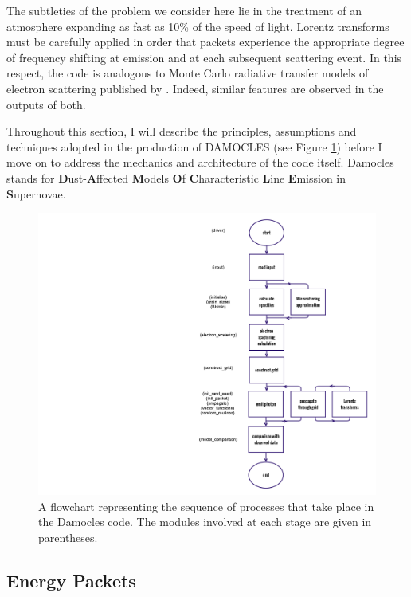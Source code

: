 The subtleties of the problem we consider here lie in the treatment of an atmosphere expanding as fast as 10\% of the speed of light.  Lorentz transforms must be carefully applied in order that packets experience the appropriate degree of frequency shifting at emission and at each subsequent scattering event.  In this respect, the code is analogous to Monte Carlo radiative transfer models of electron scattering published by \citep{Auer1972,Hillier1991}.  Indeed, similar features are observed in the outputs of both.

Throughout this section, I will describe the principles, assumptions and techniques adopted in the production of DAMOCLES (see Figure \ref{fig:flowchart}) before I move on to address the mechanics and architecture of the code itself.  Damocles stands for \textbf{D}ust-\textbf{A}ffected \textbf{M}odels \textbf{O}f \textbf{C}haracteristic \textbf{L}ine \textbf{E}mission in \textbf{S}upernovae.
 

	\begin{figure}
	\centering
	\includegraphics[scale=0.185, trim=650mm 25mm 8mm 25mm]{chapters/chapter2/code_flow.png}
	\caption{A flowchart representing the sequence of processes that take place in the Damocles code.  The modules involved at each stage are given in parentheses.}
	\label{fig:flowchart}
	\end{figure}

	
	
	\subsection{Energy Packets}
	
